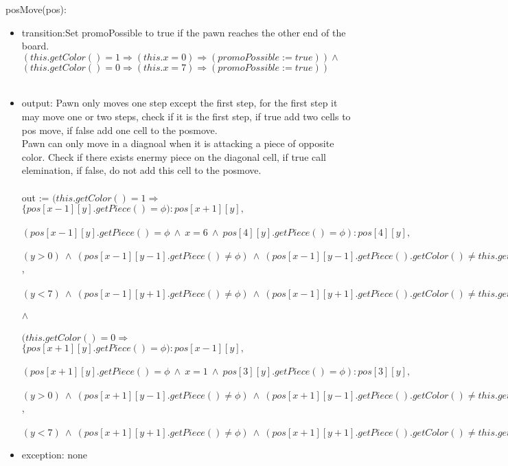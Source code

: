 \documentclass[12pt]{article}
\begin{document}
\noindent posMove(pos):
\begin{itemize}
\item transition:Set promoPossible to true if the pawn reaches the other end of the board.\\
$(this.getColor() = 1 \Rightarrow (this.x = 0) \Rightarrow (promoPossible := true)) \wedge $ \\
$(this.getColor() = 0 \Rightarrow (this.x = 7) \Rightarrow (promoPossible := true)) $ \\
\\

\item output: Pawn only moves one step except the first step, for the first step it may move one or two steps, check if it is the first step, if true add two cells to pos move, if false add one cell to the posmove.\\
Pawn can only move in a diagnoal when it is attacking a piece of opposite color. Check if there exists enermy piece on the diagonal cell, if true call elemination, if false, do not add this cell to the posmove. \\
\\
out :=  
$(this.getColor() = 1 \Rightarrow$ \\ 
$\{pos[x-1][y].getPiece() = \phi): pos[x+1][y],$ \\  
\\
$(pos[x-1][y].getPiece() = \phi \  \wedge \  x = 6 \ \wedge \ pos[4][y].getPiece()=\phi): pos[4][y],$ \\
\\
$(y>0)\  \wedge \ (pos[x-1][y-1].getPiece() \ne \phi)\ \wedge \ (pos[x-1][y-1].getPiece().getColor() \ne this.getColor()) : pos[x-1][y-1]$,\\
\\
$(y<7)\  \wedge \ (pos[x-1][y+1].getPiece() \ne \phi)\ \wedge \ (pos[x-1][y+1].getPiece().getColor() \ne this.getColor()) : pos[x-1][y+1]: pos[x-1][y+1]\}$\\
\\
$\wedge$\\
\\
$(this.getColor() = 0 \Rightarrow$ \\ 
$\{pos[x+1][y].getPiece() = \phi): pos[x-1][y],$ \\  
\\
$(pos[x+1][y].getPiece() = \phi \  \wedge \  x = 1 \ \wedge \ pos[3][y].getPiece()=\phi): pos[3][y],$ \\
\\
$(y>0)\  \wedge \ (pos[x+1][y-1].getPiece() \ne \phi)\ \wedge \ (pos[x+1][y-1].getPiece().getColor() \ne this.getColor()) : pos[x+1][y-1]$,\\
\\
$(y<7)\  \wedge \ (pos[x+1][y+1].getPiece() \ne \phi)\ \wedge \ (pos[x+1][y+1].getPiece().getColor() \ne this.getColor()) : pos[x+1][y+1]: pos[x+1][y+1]\}$\\
\item exception: none
\end{itemize}
\end{document}
